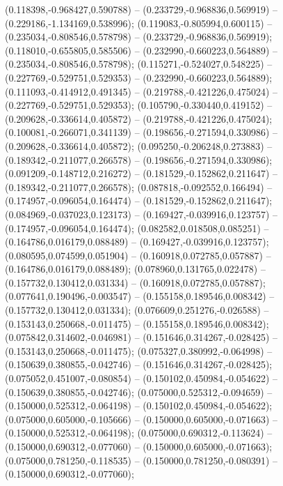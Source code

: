  (0.118398,-0.968427,0.590788) -- (0.233729,-0.968836,0.569919) -- (0.229186,-1.134169,0.538996);
 (0.119083,-0.805994,0.600115) -- (0.235034,-0.808546,0.578798) -- (0.233729,-0.968836,0.569919);
 (0.118010,-0.655805,0.585506) -- (0.232990,-0.660223,0.564889) -- (0.235034,-0.808546,0.578798);
 (0.115271,-0.524027,0.548225) -- (0.227769,-0.529751,0.529353) -- (0.232990,-0.660223,0.564889);
 (0.111093,-0.414912,0.491345) -- (0.219788,-0.421226,0.475024) -- (0.227769,-0.529751,0.529353);
 (0.105790,-0.330440,0.419152) -- (0.209628,-0.336614,0.405872) -- (0.219788,-0.421226,0.475024);
 (0.100081,-0.266071,0.341139) -- (0.198656,-0.271594,0.330986) -- (0.209628,-0.336614,0.405872);
 (0.095250,-0.206248,0.273883) -- (0.189342,-0.211077,0.266578) -- (0.198656,-0.271594,0.330986);
 (0.091209,-0.148712,0.216272) -- (0.181529,-0.152862,0.211647) -- (0.189342,-0.211077,0.266578);
 (0.087818,-0.092552,0.166494) -- (0.174957,-0.096054,0.164474) -- (0.181529,-0.152862,0.211647);
 (0.084969,-0.037023,0.123173) -- (0.169427,-0.039916,0.123757) -- (0.174957,-0.096054,0.164474);
 (0.082582,0.018508,0.085251) -- (0.164786,0.016179,0.088489) -- (0.169427,-0.039916,0.123757);
 (0.080595,0.074599,0.051904) -- (0.160918,0.072785,0.057887) -- (0.164786,0.016179,0.088489);
 (0.078960,0.131765,0.022478) -- (0.157732,0.130412,0.031334) -- (0.160918,0.072785,0.057887);
 (0.077641,0.190496,-0.003547) -- (0.155158,0.189546,0.008342) -- (0.157732,0.130412,0.031334);
 (0.076609,0.251276,-0.026588) -- (0.153143,0.250668,-0.011475) -- (0.155158,0.189546,0.008342);
 (0.075842,0.314602,-0.046981) -- (0.151646,0.314267,-0.028425) -- (0.153143,0.250668,-0.011475);
 (0.075327,0.380992,-0.064998) -- (0.150639,0.380855,-0.042746) -- (0.151646,0.314267,-0.028425);
 (0.075052,0.451007,-0.080854) -- (0.150102,0.450984,-0.054622) -- (0.150639,0.380855,-0.042746);
 (0.075000,0.525312,-0.094659) -- (0.150000,0.525312,-0.064198) -- (0.150102,0.450984,-0.054622);
 (0.075000,0.605000,-0.105666) -- (0.150000,0.605000,-0.071663) -- (0.150000,0.525312,-0.064198);
 (0.075000,0.690312,-0.113624) -- (0.150000,0.690312,-0.077060) -- (0.150000,0.605000,-0.071663);
 (0.075000,0.781250,-0.118535) -- (0.150000,0.781250,-0.080391) -- (0.150000,0.690312,-0.077060);
